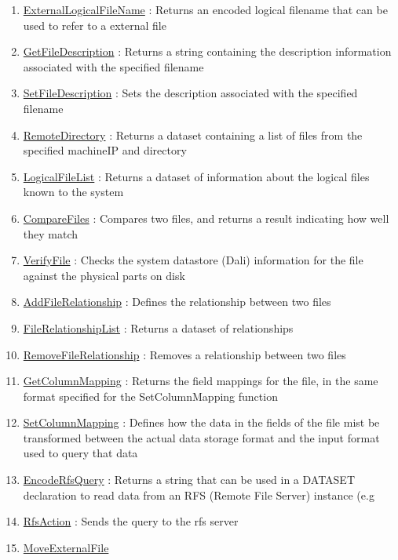 \begin{enumerate}
\item \hyperlink{ecldoc:file.externallogicalfilename}{ExternalLogicalFileName}
: Returns an encoded logical filename that can be used to refer to a external file
\item \hyperlink{ecldoc:file.getfiledescription}{GetFileDescription}
: Returns a string containing the description information associated with the specified filename
\item \hyperlink{ecldoc:file.setfiledescription}{SetFileDescription}
: Sets the description associated with the specified filename
\item \hyperlink{ecldoc:file.remotedirectory}{RemoteDirectory}
: Returns a dataset containing a list of files from the specified machineIP and directory
\item \hyperlink{ecldoc:file.logicalfilelist}{LogicalFileList}
: Returns a dataset of information about the logical files known to the system
\item \hyperlink{ecldoc:file.comparefiles}{CompareFiles}
: Compares two files, and returns a result indicating how well they match
\item \hyperlink{ecldoc:file.verifyfile}{VerifyFile}
: Checks the system datastore (Dali) information for the file against the physical parts on disk
\item \hyperlink{ecldoc:file.addfilerelationship}{AddFileRelationship}
: Defines the relationship between two files
\item \hyperlink{ecldoc:file.filerelationshiplist}{FileRelationshipList}
: Returns a dataset of relationships
\item \hyperlink{ecldoc:file.removefilerelationship}{RemoveFileRelationship}
: Removes a relationship between two files
\item \hyperlink{ecldoc:file.getcolumnmapping}{GetColumnMapping}
: Returns the field mappings for the file, in the same format specified for the SetColumnMapping function
\item \hyperlink{ecldoc:file.setcolumnmapping}{SetColumnMapping}
: Defines how the data in the fields of the file mist be transformed between the actual data storage format and the input format used to query that data
\item \hyperlink{ecldoc:file.encoderfsquery}{EncodeRfsQuery}
: Returns a string that can be used in a DATASET declaration to read data from an RFS (Remote File Server) instance (e.g
\item \hyperlink{ecldoc:file.rfsaction}{RfsAction}
: Sends the query to the rfs server
\item \hyperlink{ecldoc:file.moveexternalfile}{MoveExternalFile}

\end{enumerate}
